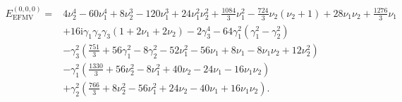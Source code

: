 \documentclass{article}
\def \cg {\gamma}
\begin{document}
\begin{align*}
E_{\mathrm{EFMV}}^{(0,0,0)} =& 4 \nu_2^4 - 60\nu_1^4  + 8 \nu_2^3 -120 \nu_1^3 + 24 \nu_1^2 \nu_2^2 +\frac{1084}{3} \nu_1^2- \frac{724}{3} \nu_2(\nu_2+1)  + 28\nu_1\nu_2  + \frac{1276}{3} \nu_1 \\
& + 16 \mathrm{i}\cg_1\cg_2\cg_3(1+2\nu_1+2\nu_2)-2\cg_3^4 - 64 \cg_1^2(\cg_1^2-\cg_2^2)  \\
&- \cg_3^2 \left( \frac{751}{3} + 56 \cg_1^2 - 8 \cg_2^2-52\nu_1^2 - 56\nu_1+8\nu_1 - 8 \nu_1\nu_2  + 12\nu_2^2 \right)   \\
& -\cg_1^2 \left( \frac{1330}{3}+56\nu_2^2 -8 \nu_1^2  +40 \nu_2-24\nu_1-16\nu_1\nu_2    \right)  \\
&+ \cg_2^2\left( \frac{766}{3} +8\nu_2^2-56\nu_1^2 +24\nu_2-40\nu_1+16\nu_1\nu_2  \right).
\end{align*}


%
%
\end{document}
